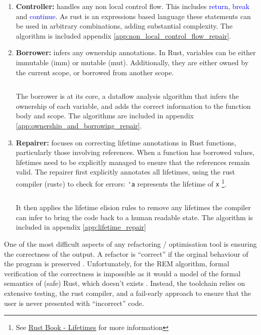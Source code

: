 \begin{enumerate}
    \item \textbf{Controller:} handles any non local control flow. This includes
    \textcolor{blue}{return}, \textcolor{blue}{break} and
    \textcolor{blue}{continue}. As rust is an expressions based language
    \cite{rbooka} these statements can be used in arbitrary
    combinations, adding substantial complexity. The algorithm is included appendix
    \ref{app:non_local_control_flow_repair}.
    \item \textbf{Borrower:} infers any ownership annotations. In Rust,
    variables can be either immutable (imm) or mutable (mut). Additionally, they
    are either owned by the current scope, or borrowed from another scope.
    \inputminted[linenos, tabsize=2]{rust}{snippets/borrow.rs}
    The borrower is at its core, a dataflow analysis algorithm that infers the ownership of each
    variable, and adds the correct information to the function body and scope.
    The algorithms are included in appendix \ref{app:ownership_and_borrowing_repair}.
    \item \textbf{Repairer:} focuses on correcting lifetime annotations in Rust
    functions, particularly those involving references. When a function has
    borrowed values, lifetimes need to be explicitly managed to ensure that the
    references remain valid. The repairer first explicitly annotates all
    lifetimes, using the rust compiler (rustc) to check for errors: \verb|'a|
    represents the lifetime of \verb|x| \footnote{See
    \href{https://doc.rust-lang.org/nomicon/lifetimes.html}{Rust Book - Lifetimes} for more information}.
    \inputminted[]{rust}{snippets/lifetime.rs}
    It then applies the lifetime elision rules \cite{rbookb} to remove any
    lifetimes the compiler can infer to bring the code back to a human readable
    state.
    The algorithm is included in appendix \ref{app:lifetime_repair}
\end{enumerate}

One of the most difficult aspects of any refactoring / optimisation tool is
ensuring the correctness of the output. A refactor is ``correct'' if the orginal
behaviour of the program is preserved \cite{ProvingCompilerOptimisations}.
Unfortunately, for the REM algorithm, formal verification of the correctness is
impossible as it would a model of the formal semantics of (safe) Rust, which
doesn't exists \cite{AdventureOfALifetime}. Instead, the toolchain relies on
extensive testing, the rust compiler, and a fail-early approach to ensure that
the user is never presented with ``incorrect'' code.

